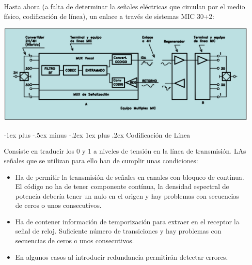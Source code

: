 \documentclass[10pt,portrait, twocolumn]{article}
\makeatletter
\renewcommand{\subsubsection}{\@startsection{subsubsection}{3}{0mm}%
                                {-1ex plus -.5ex minus -.2ex}%
                                {1ex plus .2ex}%
                                {\normalfont\small\bfseries}}
\makeatother
\begin{document}
Hasta ahora (a falta de determinar la señales eléctricas que circulan por el medio físico, codificación de línea), un enlace a través de sistemas MIC 30+2:

	\begin{center}
		\includegraphics[scale=0.2]{images/EnlaceMIC}
	\end{center}
	
\subsubsection{Codificación de Línea}

Consiste en traducir los $0$ y $1$ a niveles de tensión en la línea de transmisión. LAs señales que se utilizan para ello han de cumplir unas condiciones:

	\begin{itemize}
		\item Ha de permitir la transmisión de señales en canales con bloqueo de continua. El código no ha de tener componente contínua, la densidad espectral de potencia debería tener un nulo en el origen y hay problemas con secuencias de ceros o unos consecutivos.
		\item Ha de contener información de temporización para extraer en el receptor la señal de reloj. Suficiente número de transiciones y hay problemas con secuencias de ceros o unos consecutivos.
		\item En algunos casos al introducir redundancia permitirán detectar errores.
	\end{itemize}
	
\end{document}
